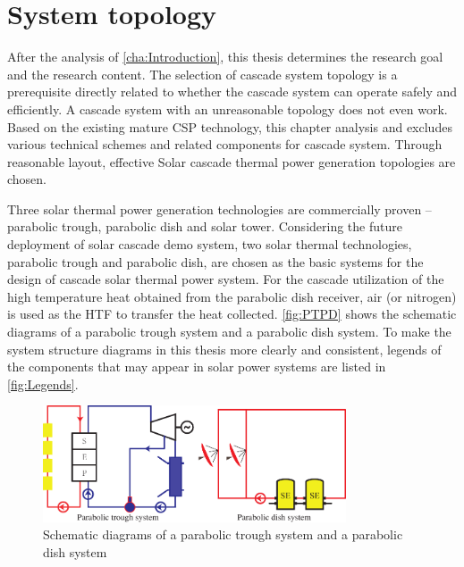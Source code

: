 \chapter{System topology}
\label{cha:SystemTopology}

After the analysis of \autoref{cha:Introduction}, this thesis determines the research goal and the research content. The selection of cascade system topology is a prerequisite directly related to whether the cascade system can operate safely and efficiently. A cascade system with an unreasonable topology does not even work. Based on the existing mature CSP technology, this chapter analysis and excludes various technical schemes and related components for cascade system. Through reasonable layout, effective Solar cascade thermal power generation topologies are chosen.

Three solar thermal power generation technologies are commercially proven -- parabolic trough, parabolic dish and solar tower. 
Considering the future deployment of solar cascade demo system, two solar thermal technologies, parabolic trough and parabolic dish, are chosen as the basic systems for the design of cascade solar thermal power system. For the cascade utilization of the high temperature heat obtained from the parabolic dish receiver, air (or nitrogen) is used as the HTF to transfer the heat collected.
\autoref{fig:PTPD} shows the schematic diagrams of a parabolic trough system and a parabolic dish system. To make the system structure diagrams in this thesis more clearly and consistent, legends of the components that may appear in solar power systems are listed in \autoref{fig:Legends}.

\begin{figure}[!ht]
\centering
\includegraphics[width=0.8\textwidth]{fig/PTPD.pdf}
\caption{Schematic diagrams of a parabolic trough system and a parabolic dish system}
\label{fig:PTPD}
\end{figure}

